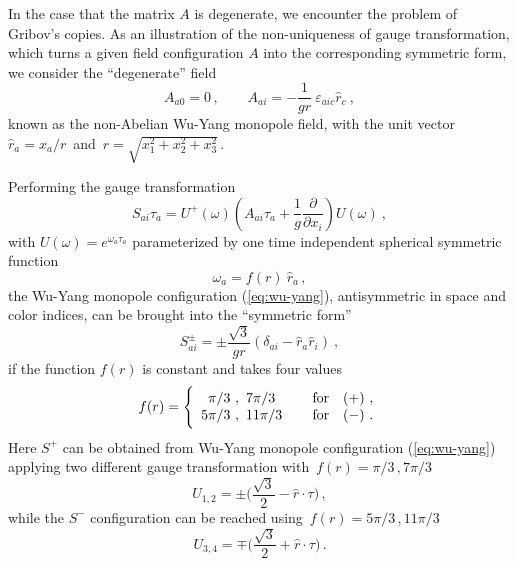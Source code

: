 \documentclass[a4paper,12pt]{article}
\begin{document}
In the case that the matrix $A$ is degenerate, we encounter the problem
of Gribov's copies.
As an illustration of the non-uniqueness of gauge transformation, which
turns a given field configuration $A$ into the corresponding symmetric form,
we consider the ``degenerate'' field
\begin{equation}
\label{eq:wu-yang}
A_{a0} = 0\,, \qquad
A_{ai} = - \frac{1}{g r}\  \varepsilon_{aic}\hat{r}_c~,
\end{equation}
known as the non-Abelian Wu-Yang monopole field, with the unit vector
$\hat{r}_a = x_a/r\,$ and $\, r = \sqrt{x_1^2+x_2^2 + x_3^2}$\,.

Performing the gauge transformation
\begin{equation}
\label{eg:gtrw}
S_{ai}\tau_a= U^+ (\omega)
\left( A_{ai}\tau_a + \frac{1}{g}\frac{\partial}{\partial x_i} \right)U(\omega)~,
\end{equation}
with $U(\omega)= e^{\omega_a\tau_a}$ parameterized by one time independent
spherical symmetric function
\begin{equation}\label{eq:fgtr}
\omega_a = f(r)\ \hat{r}_a\,,
\end{equation}
the Wu-Yang monopole configuration (\ref{eq:wu-yang}),
antisymmetric in space and color indices, can be brought into the
``symmetric form''
\begin{equation}
\label{eq:sinsy}
S_{ai}^{\pm} = \pm \frac{\sqrt{3}}{g r}
\left(\delta_{ai} - \hat{r}_a \hat{r}_i\right)~,
\end{equation}
if the function $f(r)$ is constant and takes four values
\begin{equation}
\label{eq:wutr}
f(r) = \Bigg\{ \begin{array}{cc}\pi/3~,~ 7\pi/3\, &\quad {\rm for}\quad (+)~,
       \\ 5\pi/3~,~ 11\pi/3\, &\quad {\rm for}\quad (-)~. \end{array}
\end{equation}
Here $S^+$ can be obtained from
Wu-Yang monopole configuration (\ref{eq:wu-yang}) applying two different
gauge transformation with $\, f(r)=\pi /3\,, 7\pi/3$
\begin{equation}\label{eq:gtrv_}
U_{1,2} =\pm \Big(\frac{\sqrt{3}}{2} - \hat{r}\cdot \tau \Big)\,,
\end{equation}
while the $S^{-}$ configuration
can be reached using $\, f(r)= 5\pi/3\,, 11\pi/3$
\begin{equation}\label{eq:gtrv-}
U_{3, 4} =\mp \Big(\frac{\sqrt{3}}{2}+ \hat{r}\cdot \tau \Big)\,.
\end{equation}
\end{document}

